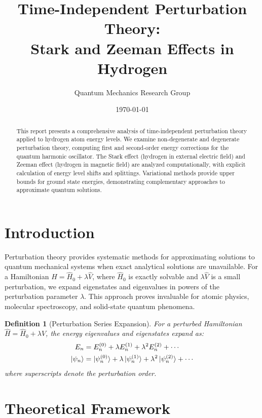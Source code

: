 \documentclass[a4paper, 11pt]{article}
\title{Time-Independent Perturbation Theory:\\Stark and Zeeman Effects in Hydrogen}
\author{Quantum Mechanics Research Group}
\date{\today}
\newtheorem{definition}{Definition}[section]
\begin{document}
\maketitle

\begin{abstract}
This report presents a comprehensive analysis of time-independent perturbation theory
applied to hydrogen atom energy levels. We examine non-degenerate and degenerate
perturbation theory, computing first and second-order energy corrections for the
quantum harmonic oscillator. The Stark effect (hydrogen in external electric field)
and Zeeman effect (hydrogen in magnetic field) are analyzed computationally, with
explicit calculation of energy level shifts and splittings. Variational methods
provide upper bounds for ground state energies, demonstrating complementary
approaches to approximate quantum solutions.
\end{abstract}

\section{Introduction}

Perturbation theory provides systematic methods for approximating solutions to
quantum mechanical systems when exact analytical solutions are unavailable. For
a Hamiltonian $\hat{H} = \hat{H}_0 + \lambda \hat{V}$, where $\hat{H}_0$ is
exactly solvable and $\lambda \hat{V}$ is a small perturbation, we expand
eigenstates and eigenvalues in powers of the perturbation parameter $\lambda$.
This approach proves invaluable for atomic physics, molecular spectroscopy,
and solid-state quantum phenomena.

\begin{definition}[Perturbation Series Expansion]
For a perturbed Hamiltonian $\hat{H} = \hat{H}_0 + \lambda \hat{V}$, the
energy eigenvalues and eigenstates expand as:
\begin{align}
E_n &= E_n^{(0)} + \lambda E_n^{(1)} + \lambda^2 E_n^{(2)} + \cdots \\
\ket{\psi_n} &= \ket{\psi_n^{(0)}} + \lambda \ket{\psi_n^{(1)}} + \lambda^2 \ket{\psi_n^{(2)}} + \cdots
\end{align}
where superscripts denote the perturbation order.
\end{definition}

\section{Theoretical Framework}
\end{document}

